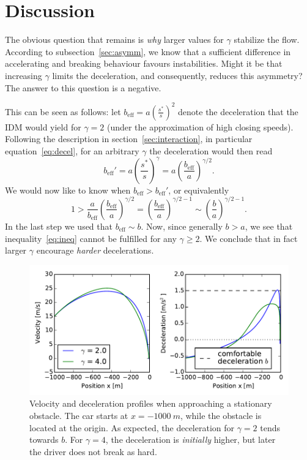 \section{Discussion}
The obvious question that remains is \emph{why} larger values for $\gamma$ stabilize the flow. According to subsection~\ref{sec:asymm}, we know that a sufficient difference in accelerating and breaking behaviour favours instabilities. Might it be that increasing $\gamma$ limits the deceleration, and consequently, reduces this asymmetry? The answer to this question is a negative. 

This can be seen as follows: let $b_\mathrm{eff} = a\left(\frac{s^*}{s}\right)^2$ denote the deceleration that the IDM would yield for $\gamma=2$ (under the approximation of high closing speeds). 
Following the description in section~\ref{sec:interaction}, in particular equation~\eqref{eq:decel}, for an arbitrary $\gamma$ the deceleration would then read
\begin{equation}
    b_\mathrm{eff}' = a\left(\frac{s^*}{s}\right)^\gamma = a \left(\frac{b_\mathrm{eff}}{a}\right)^{\gamma/2}.
\end{equation}
We would now like to know when $b_\mathrm{eff}>b_\mathrm{eff}'$, or equivalently
\begin{equation}
1>\frac{a}{b_\mathrm{eff}} \left(\frac{b_\mathrm{eff}}{a}\right)^{\gamma/2} = \left(\frac{b_\mathrm{eff}}{a}\right)^{\gamma/2-1}\sim\left(\frac{b}{a}\right)^{\gamma/2-1}.
\label{eq:ineq}
\end{equation}
In the last step we used that $b_\mathrm{eff}\sim b$. Now, since generally $b>a$, we see that inequality~\eqref{eq:ineq} cannot be fulfilled for any $\gamma\ge 2$. We conclude that in fact larger $\gamma$ encourage \emph{harder} decelerations.

\begin{figure}
    \centering
    \includegraphics[width=5in]{../img/vel_profile.pdf}
    \caption{Velocity and deceleration profiles when approaching a stationary obstacle. The car starts at $x=\SI{-1000}{m}$, while the obstacle is located at the origin. As expected, the deceleration for $\gamma=2$ tends towards $b$. For $\gamma=4$, the deceleration is \emph{initially} higher, but later the driver does not break as hard.}
    \label{fig:vel_profile}
\end{figure}

